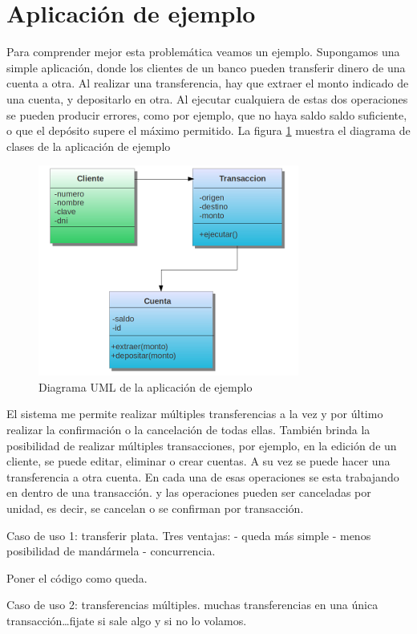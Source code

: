 \section{Aplicación de ejemplo}
Para comprender mejor esta problemática veamos un ejemplo. Supongamos una simple
aplicación, donde los clientes de un banco pueden transferir dinero de
una cuenta a otra. Al realizar una transferencia, hay que extraer el monto
indicado de una cuenta, y depositarlo en otra. 
Al ejecutar cualquiera de estas dos operaciones se pueden producir errores,
como por ejemplo, que no haya saldo saldo suficiente, o que el depósito supere
el máximo permitido.
La  figura \ref{example} muestra el diagrama de clases de la aplicación de
ejemplo

	\begin{figure}[h]
		\includegraphics{img/objectTransaction}
		\caption{Diagrama UML de la aplicación de ejemplo}
		\label{example}
	\end{figure}	


El sistema me permite realizar múltiples transferencias a la vez y por último
realizar la confirmación o la cancelación de todas ellas. También brinda la posibilidad
de realizar múltiples transacciones, por ejemplo, en la edición de un cliente,
se puede editar, eliminar o crear cuentas. A su vez se puede hacer una
transferencia a otra cuenta. En cada una de esas operaciones se esta
trabajando en dentro de una transacción. y las operaciones pueden ser
canceladas por unidad, es decir, se cancelan o se confirman por transacción.

Caso de uso 1: transferir plata.
Tres ventajas:
- queda más simple
- menos posibilidad de mandármela
- concurrencia.

Poner el código como queda.

Caso de uso 2: transferencias múltiples.
muchas transferencias en una única transacción\ldots fijate si sale algo y si no
lo volamos.

